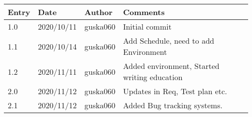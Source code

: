 \begin{tabular}{ |p{3cm}|p{3cm}|p{3cm}|p{3cm}|  }
 

 \hline
 Entry & Date & Author &Comments \\
 \hline
 1.0   & 2020/10/11  &guska060 &  Initial commit\\
 

 \hline
 1.1   & 2020/10/14  &guska060 & Add Schedule, need to add Environment\\
 
 \hline
 1.2   & 2020/11/11  &guska060 & Added environment, Started writing education\\
 
 \hline
 2.0   & 2020/11/12  &guska060 & Updates in Req, Test plan etc.\\
 
 \hline
 2.1   & 2020/11/12  &guska060 & Added Bug tracking systems.\\
 
 \hline
\end{tabular}